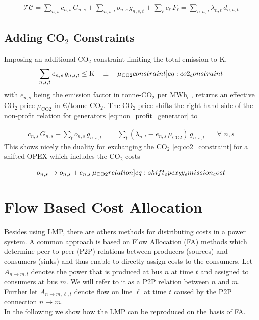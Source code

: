 \documentclass[11pt]{article}
\newcommand{\generation}{g_{n,s,t}}
\newcommand{\capacityGeneration}{G_{n,s}}
\newcommand{\capacityFlow}{F_{\ell}}
\newcommand{\capexGeneration}{c_{n,s}}
\newcommand{\capexFlow}{c_{\ell}}
\newcommand{\opexGeneration}[1][n]{o_{#1,s}}
\newcommand{\demand}[1][n]{d_{#1,a,t}}
\newcommand{\lmp}[1][n]{\lambda_{#1,t}}
\newcommand{\allocatePeer}[1][n \rightarrow m]{A_{#1,t}}
\newcommand{\allocateTransaction}[1][n \rightarrow m]{A_{#1,\ell,t}}
\newcommand{\emission}{e_{n,s}}
\newcommand{\emissionPrice}{\mu_{\text{CO2}}}
\newcommand{\megawatthour}{MWh$_\text{el}$}
\newcommand{\totalcost}{\mathcal{TC}}
\newcommand{\resultsin}[1]{\hspace{12pt} \bot  \hspace{12pt} #1}
\newcommand{\Forall}[1]{\hspace{20pt} \forall \,\, #1 }
\begin{document}
\begin{align}
\totalcost = \sum_{n,s} \capexGeneration \, \capacityGeneration + \sum_{n,s,t} \opexGeneration \, \generation + \sum_{\ell} \capexFlow \, \capacityFlow = \sum_{n,a,t} \lmp \, \demand 
\label{eq:total_system_cost}
\end{align}


\subsection*{Adding CO$_2$ Constraints}

Imposing an additional CO$_2$ constraint limiting the total emission to K,  
\begin{align}
 \sum_{n,s,t} \emission \, \generation \le \text{K} \resultsin{\emissionPrice} 
 \label[constraint]{eq:co2_constraint}
\end{align}
with $\emission$ being the emission factor in tonne-CO$_2$ per \megawatthour, returns an effective CO$_2$ price $\emissionPrice$ in \euro/tonne-CO$_2$. The CO$_2$ price shifts the right hand side of the non-profit relation for generators \cref{eq:non_profit_generator} to

\begin{align}
\capexGeneration \, \capacityGeneration + \sum_{t} \opexGeneration \, \generation &= \sum_{t} \left( \lmp - \emission \, \emissionPrice \right)  \, \generation \Forall{n,s} 
\label{eq:non_profit_generator_emission}
\end{align}
This shows nicely the duality for exchanging the CO$_2$ \cref{eq:co2_constraint} for a shifted OPEX which includes the CO$_2$ costs

\begin{align}
\opexGeneration \rightarrow \opexGeneration + \emission \, \emissionPrice \label[relation]{eq:shift_opex_by_emission_cost}
\end{align}


\section*{Flow Based Cost Allocation}

Besides using LMP, there are others methods for distributing costs in a power system. A common approach is based on Flow Allocation (FA) methods which determine peer-to-peer (P2P) relations between producers (sources) and consumers (sinks) and thus enable to directly assign costs to the consumers. %
Let $\allocatePeer$ denotes the power that is produced at bus $n$ at time $t$ and assigned to consumers at bus $m$. We will refer to it as a P2P relation between $n$ and $m$. Further let $\allocateTransaction$ denote flow on line $\ell$ at time $t$ caused by the P2P connection $n\rightarrow m$.\\
\noindent
In the following we show how the LMP can be reproduced on the basis of FA. 
\end{document}
